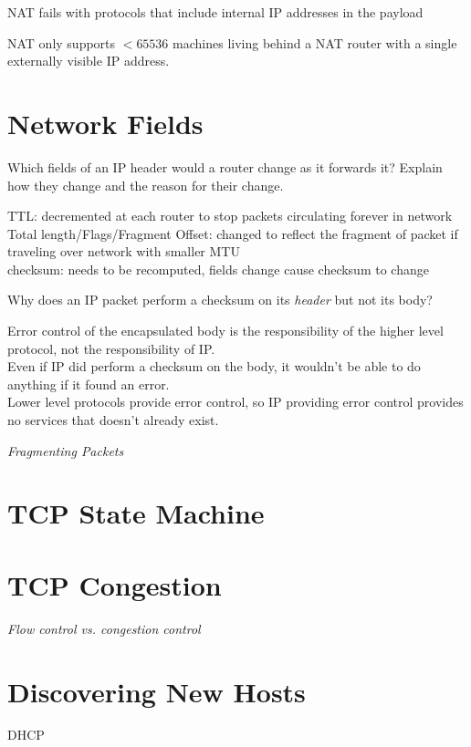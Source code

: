 NAT fails with protocols that include internal IP addresses in the payload

NAT only supports $< 65536$ machines living behind a NAT router with a 
single externally visible IP address. 





\section{Network Fields}

\begin{example}
Which fields of an IP header would a router change as it forwards it? 
Explain how they change and the reason for their change.

TTL: decremented at each router to stop packets circulating forever in network\\
Total length/Flags/Fragment Offset: changed to reflect the fragment of packet 
if traveling over network with smaller MTU\\
checksum: needs to be recomputed, fields change cause checksum to change
\end{example}

\frmrule

\begin{example}
Why does an IP packet perform a checksum on its \textit{header} but not its body?

Error control of the encapsulated body is the responsibility of the higher level protocol, 
not the responsibility of IP. \\
Even if IP did perform a checksum on the body, it wouldn't be able to do anything 
if it found an error. \\
Lower level protocols provide error control, 
so IP providing error control provides no services that doesn't already exist.
\end{example}


\frmrule

\textit{Fragmenting Packets}







\frmrule




\section{TCP State Machine}


\section{TCP Congestion}


\frmrule 

\textit{Flow control vs. congestion control}




\section{Discovering New Hosts}

DHCP